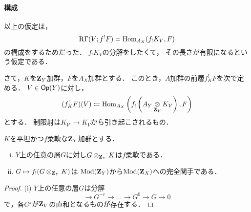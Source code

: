 \paragraph{構成}
以上の仮定は，
\[
    \mathop{\mathrm{R}\hspace{-0pt}\Gamma}\nolimits(V;f^!{F})
    =\mathop{\mathrm{Hom}}\nolimits_{A_X}({f_!}K_V,F)
\]
の構成をするためだった．
\(f_!K_V\)の分解をしたくて，
その長さが有限になるという仮定である．

さて，\(K\)を\(\mathbf{Z}_Y\)加群，\(F\)を\(A_X\)加群とする．
このとき，\(A\)加群の前層\(f^!_KF\)を次で定める．
\(V\in\mathop{\textsf{Op}}\nolimits(Y)\)に対し，
\[
    (f^!_KF)(V)
    \coloneqq
    \mathop{\mathrm{Hom}}\nolimits_{A_X}\left(f_!\left(
        A_Y\mathop{\otimes}\limits_{\mathbf{Z}_Y}K_V
    \right),F\right)
\]
とする．
制限射は\(K_{V'}\to{K_V}\)から引き起こされるもの．

\begin{LMM}
    \(K\)を平坦かつ\(f\)柔軟な\(\mathbf{Z}_Y\)加群とする．
    \begin{enumerate}[(i)]
        \item \(Y\)上の任意の層\(G\)に対し\(G\otimes_{\mathbf{Z}_Y}K\)は\(f\)柔軟である．
        \item \(G\mapsto f_!(G\otimes_{\mathbf{Z}_Y}K)\)は
        \(\mathop{\mathrm{Mod}}\nolimits(\mathbf{Z}_Y)\)から\(\mathop{\mathrm{Mod}}\nolimits(\mathbf{Z}_X)\)への完全関手である．
    \end{enumerate}
\end{LMM}
\begin{proof}
    (i) 
    \(Y\)上の任意の層\(G\)は分解
    \[
        \to{G^{-r}}\to\dots\to{G^{0}}\to{G}\to0
    \]
    で，各\(G^{j}\)が\(\mathbf{Z}_V\)の直和となるものが存在する．
\end{proof}









\backmatter
\appendix
